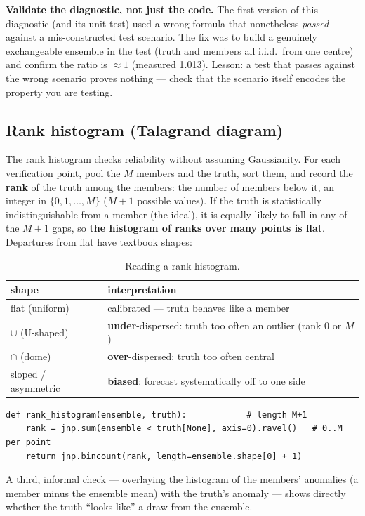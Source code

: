 \documentclass[11pt]{article}
\begin{document}
\begin{keybox}
\textbf{Validate the diagnostic, not just the code.} The first version of this
diagnostic (and its unit test) used a wrong formula that nonetheless
\emph{passed} against a mis-constructed test scenario. The fix was to build a
genuinely exchangeable ensemble in the test (truth and members all i.i.d.\ from
one centre) and confirm the ratio is $\approx 1$ (measured 1.013). Lesson: a test
that passes against the wrong scenario proves nothing --- check that the scenario
itself encodes the property you are testing.
\end{keybox}

\subsection{Rank histogram (Talagrand diagram)}\label{sec:rankhist}

The rank histogram \citep{hamill2001} checks reliability without assuming
Gaussianity. For each verification point, pool the $M$ members and the truth,
sort them, and record the \textbf{rank} of the truth among the members: the number
of members below it, an integer in $\{0,1,\dots,M\}$ ($M{+}1$ possible values).
If the truth is statistically indistinguishable from a member (the ideal), it is
equally likely to fall in any of the $M{+}1$ gaps, so \textbf{the histogram of
ranks over many points is flat}. Departures from flat have textbook shapes:

\begin{table}[h]
\centering
\caption{Reading a rank histogram.}
\label{tab:rank}
\begin{tabular}{ll}
\toprule
shape & interpretation \\
\midrule
flat (uniform)            & calibrated --- truth behaves like a member \\
$\cup$ (U-shaped)         & \textbf{under}-dispersed: truth too often an outlier (rank 0 or $M$) \\
$\cap$ (dome)             & \textbf{over}-dispersed: truth too often central \\
sloped / asymmetric       & \textbf{biased}: forecast systematically off to one side \\
\bottomrule
\end{tabular}
\end{table}

\begin{lstlisting}
def rank_histogram(ensemble, truth):            # length M+1
    rank = jnp.sum(ensemble < truth[None], axis=0).ravel()   # 0..M per point
    return jnp.bincount(rank, length=ensemble.shape[0] + 1)
\end{lstlisting}
A third, informal check --- overlaying the histogram of the members' anomalies (a
member minus the ensemble mean) with the truth's anomaly --- shows directly
whether the truth ``looks like'' a draw from the ensemble.
\end{document}
